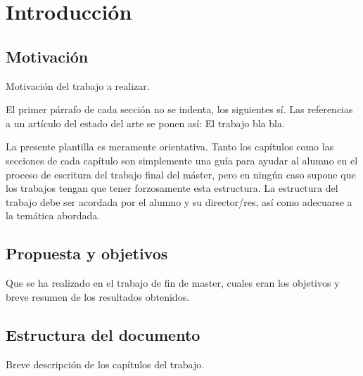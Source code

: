 
\chapter{Introducción}
\label{ch:Introduccion}

\section{Motivación}
\label{sec:Motivacion}

\noindent Motivación del trabajo a realizar.

El primer párrafo de cada sección no se indenta, los siguientes sí.
Las referencias a un artículo del estado del arte se ponen así: El trabajo \cite{Agirre2009} bla bla.

La presente plantilla es meramente orientativa. Tanto los capítulos como las secciones de cada capítulo son simplemente una guía para ayudar al alumno en el proceso de escritura del trabajo final del máster, pero en ningún caso supone que los trabajos tengan que tener forzosamente esta estructura. La estructura del trabajo debe ser acordada por el alumno y su director/res, así como adecuarse a la temática abordada.

\section{Propuesta y objetivos}
\label{sec:PropuestaYObjetivos}

\noindent Que se ha realizado en el trabajo de fin de master, cuales eran los objetivos y breve resumen de los resultados obtenidos.

\section{Estructura del documento}
\label{sec:EstructuraDelDocumento}

\noindent Breve descripción de los capítulos del trabajo.

